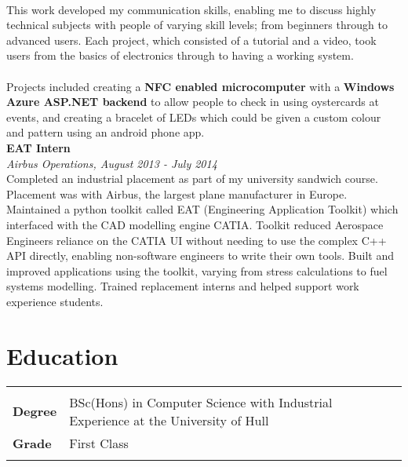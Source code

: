 \documentclass{article}
\begin{document}
\begin{flushleft}
\paragraph{}This work developed my communication skills, enabling me to discuss highly technical subjects with people of varying skill levels; from beginners through to advanced users. Each project, which consisted of a tutorial and a video, took users from the basics of electronics through to having a working system.

\paragraph{}Projects included creating a \textbf{NFC enabled microcomputer} with a \textbf{Windows Azure ASP.NET backend} to allow people to check in using oystercards at events, and creating a bracelet of LEDs which could be given a custom colour and pattern using an android phone app. \\[10pt]

\textbf{EAT Intern}\\
\textit{Airbus Operations, August 2013 - July 2014}\\[5pt]
Completed an industrial placement as part of my university sandwich course. Placement was with Airbus, the largest plane manufacturer in Europe. Maintained a python toolkit called EAT (Engineering Application Toolkit) which interfaced with the CAD modelling engine CATIA. Toolkit reduced Aerospace Engineers reliance on the CATIA UI without needing to use the complex C++ API directly, enabling non-software engineers to write their own tools. Built and improved applications using the toolkit, varying from stress calculations to fuel systems modelling. Trained replacement interns and helped support work experience students.

\section*{Education}
\begin{tabular}{@{}ll@{}}
    \multicolumn{2}{l}{}\\
    \textbf{Degree} &BSc(Hons) in Computer Science with Industrial Experience at the University of Hull  \\
    \textbf{Grade} &First Class   \\
    &\\
\end{tabular}


\end{flushleft}
\end{document}
